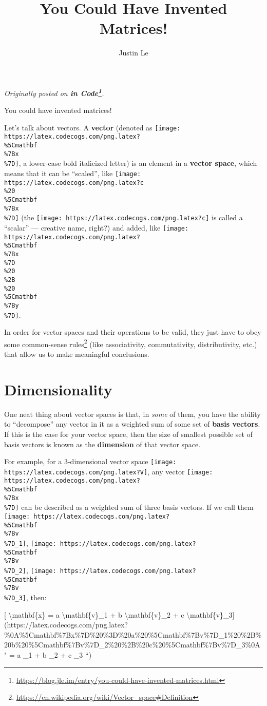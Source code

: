 \documentclass[]{article}
\title{You Could Have Invented Matrices!}
\author{Justin Le}
\renewcommand{\href}[2]{#2\footnote{\url{#1}}}
\begin{document}
\maketitle

\emph{Originally posted on
\textbf{\href{https://blog.jle.im/entry/you-could-have-invented-matrices.html}{in
Code}}.}

You could have invented matrices!

Let's talk about vectors. A \textbf{vector} (denoted as
\texttt{[image: https://latex.codecogs.com/png.latex?\\\%5Cmathbf\\\%7Bx\\\%7D]}, a
lower-case bold italicized letter) is an element in a \textbf{vector space},
which means that it can be ``scaled'', like
\texttt{[image: https://latex.codecogs.com/png.latex?c\\\%20\\\%5Cmathbf\\\%7Bx\\\%7D]}
(the \texttt{[image: https://latex.codecogs.com/png.latex?c]} is called a
``scalar'' --- creative name, right?) and added, like
\texttt{[image: https://latex.codecogs.com/png.latex?\\\%5Cmathbf\\\%7Bx\\\%7D\\\%20\\\%2B\\\%20\\\%5Cmathbf\\\%7By\\\%7D]}.

In order for vector spaces and their operations to be valid, they just have to
obey some
\href{https://en.wikipedia.org/wiki/Vector_space\#Definition}{common-sense
rules} (like associativity, commutativity, distributivity, etc.) that allow us
to make meaningful conclusions.

\hypertarget{dimensionality}{%
\section{Dimensionality}\label{dimensionality}}

One neat thing about vector spaces is that, in \emph{some} of them, you have the
ability to ``decompose'' any vector in it as a weighted sum of some set of
\textbf{basis vectors}. If this is the case for your vector space, then the size
of smallest possible set of basis vectors is known as the \textbf{dimension} of
that vector space.

For example, for a 3-dimensional vector space
\texttt{[image: https://latex.codecogs.com/png.latex?V]}, any vector
\texttt{[image: https://latex.codecogs.com/png.latex?\\\%5Cmathbf\\\%7Bx\\\%7D]} can
be described as a weighted sum of three basis vectors. If we call them
\texttt{[image: https://latex.codecogs.com/png.latex?\\\%5Cmathbf\\\%7Bv\\\%7D\_1]},
\texttt{[image: https://latex.codecogs.com/png.latex?\\\%5Cmathbf\\\%7Bv\\\%7D\_2]},
\texttt{[image: https://latex.codecogs.com/png.latex?\\\%5Cmathbf\\\%7Bv\\\%7D\_3]},
then:

{[} \textbackslash{}mathbf\{x\} = a \textbackslash{}mathbf\{v\}\_1 + b
\textbackslash{}mathbf\{v\}\_2 + c
\textbackslash{}mathbf\{v\}\_3{]}(https://latex.codecogs.com/png.latex?\%0A\%5Cmathbf\%7Bx\%7D\%20\%3D\%20a\%20\%5Cmathbf\%7Bv\%7D\_1\%20\%2B\%20b\%20\%5Cmathbf\%7Bv\%7D\_2\%20\%2B\%20c\%20\%5Cmathbf\%7Bv\%7D\_3\%0A
"  = a \_1 + b \_2 + c \_3 ``)
\end{document}
